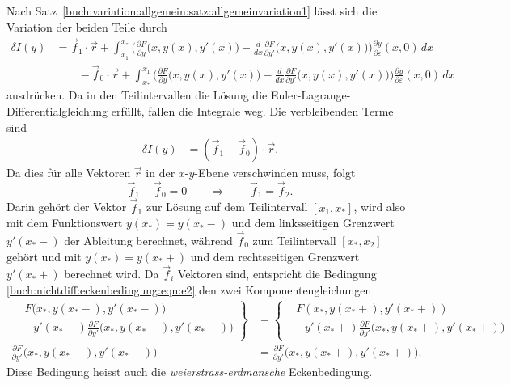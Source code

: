 Nach Satz~\ref{buch:variation:allgemein:satz:allgemeinvariation1} 
lässt sich die Variation der beiden Teile durch 
\begin{align*}
\delta I(y)
&=
\vec{f}_1\cdot \vec{r}
+
\int_{x_1}^{x_*}
\biggl(
\frac{\partial F}{\partial y}\bigl(x,y(x),y'(x)\bigr)
-
\frac{d}{dx}
\frac{\partial F}{\partial y'}\bigl(x,y(x),y'(x)\bigr)
\biggr)
\frac{\partial y}{\partial\varepsilon}(x,0)\,dx
\\
&\qquad
-
\vec{f}_0\cdot \vec{r}
+
\int_{x_*}^{x_1}
\biggl(
\frac{\partial F}{\partial y}\bigl(x,y(x),y'(x)\bigr)
-
\frac{d}{dx}
\frac{\partial F}{\partial y'}\bigl(x,y(x),y'(x)\bigr)
\biggr)
\frac{\partial y}{\partial\varepsilon}(x,0)\,dx
\end{align*}
ausdrücken.
Da in den Teilintervallen die Lösung die Euler-Lagrange-Differentialgleichung
erfüllt, fallen die Integrale weg.
Die verbleibenden Terme sind
\begin{align*}
\delta I(y)
&=
(\vec{f}_1-\vec{f}_0)\cdot \vec{r}.
\end{align*}
Da dies für alle Vektoren $\vec{r}$ in der $x$-$y$-Ebene verschwinden muss,
folgt
\begin{equation}
\vec{f}_1-\vec{f}_0
=
0
\qquad\Rightarrow\qquad
\vec{f}_1=\vec{f}_2.
\label{buch:nichtdiff:eckenbedingung:eqn:e2}
\end{equation}
Darin gehört der Vektor $\vec{f}_1$ zur Lösung auf dem Teilintervall
$[x_1,x_*]$,
wird also mit dem Funktionswert $y(x_*)=y(x_*-)$ und dem linksseitigen Grenzwert
$y'(x_*-)$ der Ableitung berechnet, während $\vec{f}_0$ zum Teilintervall
$[x_*,x_2]$ gehört und mit $y(x_*)=y(x_*+)$ und dem rechtsseitigen
Grenzwert $y'(x_*+)$ berechnet wird.
Da $\vec{f}_i$ Vektoren sind, entspricht die Bedingung
\eqref{buch:nichtdiff:eckenbedingung:eqn:e2}
den zwei Komponentengleichungen
\begin{align*}
\left.
\begin{aligned}
&F\bigl(x_*,y(x_*-),y'(x_*-)\bigr)
\\
&- 
y'(x_*-)
\frac{\partial F}{\partial y'}\bigl(x_*,y(x_*-), y'(x_*-)\bigr)
\end{aligned}\right\}
&=
\left\{
\begin{aligned}
&F(x_*,y(x_*+),y'(x_*+))
\\
&- 
y'(x_*+)
\frac{\partial F}{\partial y'}\bigl(x_*,y(x_*+), y'(x_*+)\bigr)
\end{aligned}
\right.
\\
\frac{\partial F}{\partial y'}\bigl(x_*,y(x_*-), y'(x_*-)\bigr)
&=
\frac{\partial F}{\partial y'}\bigl(x_*,y(x_*+), y'(x_*+)\bigr).
\end{align*}
Diese Bedingung heisst auch die {\em weierstrass-erdmansche} Eckenbedingung.
%
%

